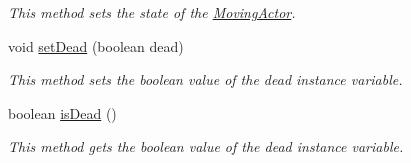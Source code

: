 \begin{DoxyCompactItemize}
\begin{DoxyCompactList}\small\item\em This method sets the state of the \hyperlink{classnl_1_1arjanfrans_1_1mario_1_1model_1_1MovingActor}{Moving\+Actor}. \end{DoxyCompactList}\item 
void \hyperlink{classnl_1_1arjanfrans_1_1mario_1_1model_1_1MovingActor_a331dd9271c5023d07f1840b029e703d9}{set\+Dead} (boolean dead)
\begin{DoxyCompactList}\small\item\em This method sets the boolean value of the dead instance variable. \end{DoxyCompactList}\item 
boolean \hyperlink{classnl_1_1arjanfrans_1_1mario_1_1model_1_1MovingActor_a5a5575f015d9ba97fcf344ae203f893c}{is\+Dead} ()
\begin{DoxyCompactList}\small\item\em This method gets the boolean value of the dead instance variable. \end{DoxyCompactList}\end{DoxyCompactItemize}
